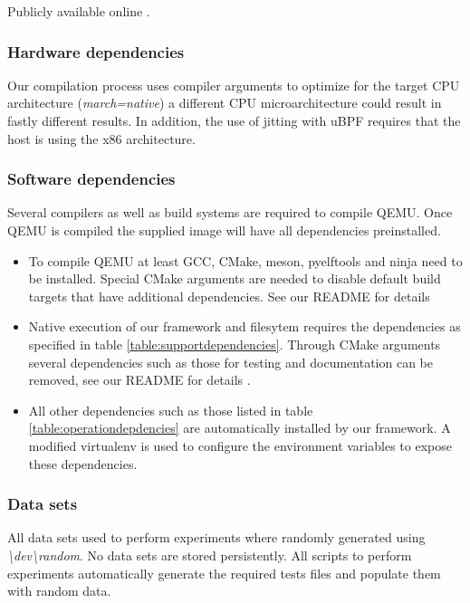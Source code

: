 Publicly available online \cite{qemu-csd}.

\subsubsection{Hardware dependencies}

Our compilation process uses compiler arguments to optimize for the target CPU
architecture (\textit{march=native}) a different CPU microarchitecture could
result in fastly different results. In addition, the use of jitting with uBPF
requires that the host is using the x86 architecture.

\subsubsection{Software dependencies}

Several compilers as well as build systems are required to compile QEMU. Once
QEMU is compiled the supplied image will have all dependencies preinstalled.

\begin{itemize}
    \item To compile QEMU at least GCC, CMake, meson, pyelftools and ninja need
    to be installed. Special CMake arguments are needed to disable default build
    targets that have additional dependencies. See our README for details
    \cite{qemu-csd}
    \item Native execution of our framework and filesytem requires the
    dependencies as specified in table \ref{table:supportdependencies}.
    Through CMake arguments several dependencies such as those for testing and
    documentation can be removed, see our README for details \cite{qemu-csd}.
    \item All other dependencies such as those listed in table
    \ref{table:operationdepdencies} are automatically installed by our
    framework. A modified virtualenv is used to configure the environment
    variables to expose these dependencies.
\end{itemize}

\subsubsection{Data sets}

All data sets used to perform experiments where randomly generated using
\textit{\textbackslash dev\textbackslash random}. No data sets are stored
persistently. All scripts to perform experiments automatically generate the
required tests files and populate them with random data.

